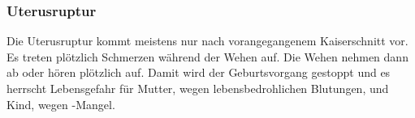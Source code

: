 % 
% 
% 


\subsubsection{Uterusruptur}

Die Uterusruptur kommt meistens nur nach vorangegangenem
Kaiserschnitt vor. Es treten plötzlich Schmerzen während
der Wehen auf. Die Wehen nehmen dann ab oder hören
plötzlich auf. Damit wird der Geburtsvorgang gestoppt und es herrscht Lebensgefahr für Mutter, wegen lebensbedrohlichen Blutungen, und Kind, wegen -Mangel.


% 
% 
% 
% 

